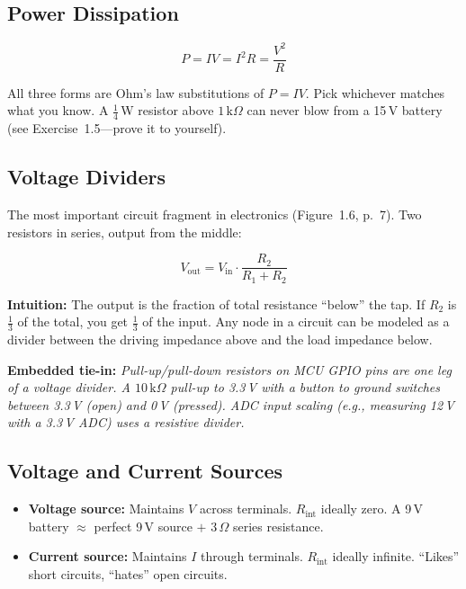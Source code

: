 \documentclass[11pt,a4paper]{article}
\newcommand{\intuition}[1]{\par\textcolor{intuition}{\textbf{Intuition:}} #1}
\newcommand{\embedded}[1]{\par\textcolor{embed}{\textbf{Embedded tie-in:}} \textit{#1}}
\begin{document}
\subsection{Power Dissipation}

\[
P = IV = I^2 R = \frac{V^2}{R}
\]

All three forms are Ohm's law substitutions of $P = IV$. Pick whichever matches what you know. A $\frac{1}{4}\,$W resistor above $1\,\text{k}\Omega$ can never blow from a 15\,V battery (see Exercise~1.5---prove it to yourself).

\subsection{Voltage Dividers}

The most important circuit fragment in electronics (Figure~1.6, p.~7). Two resistors in series, output from the middle:

\begin{equation}
\boxed{V_{\text{out}} = V_{\text{in}} \cdot \frac{R_2}{R_1 + R_2}}
\end{equation}

\intuition{The output is the fraction of total resistance ``below'' the tap. If $R_2$ is $\frac{1}{3}$ of the total, you get $\frac{1}{3}$ of the input. Any node in a circuit can be modeled as a divider between the driving impedance above and the load impedance below.}

\embedded{Pull-up/pull-down resistors on MCU GPIO pins are one leg of a voltage divider. A $10\,\text{k}\Omega$ pull-up to 3.3\,V with a button to ground switches between 3.3\,V (open) and 0\,V (pressed). ADC input scaling (e.g., measuring 12\,V with a 3.3\,V ADC) uses a resistive divider.}

\subsection{Voltage and Current Sources}

\begin{itemize}[nosep]
\item \textbf{Voltage source:} Maintains $V$ across terminals. $R_{\text{int}}$ ideally zero. A 9\,V battery $\approx$ perfect 9\,V source $+$ $3\,\Omega$ series resistance.
\item \textbf{Current source:} Maintains $I$ through terminals. $R_{\text{int}}$ ideally infinite. ``Likes'' short circuits, ``hates'' open circuits.
\end{itemize}
\end{document}
